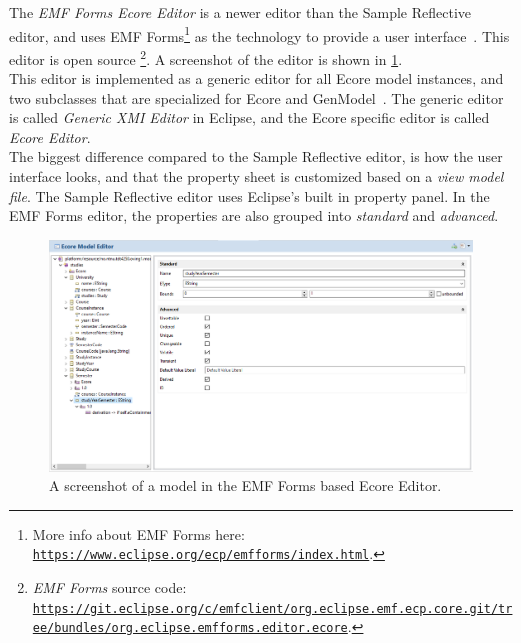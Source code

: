 The \textit{EMF Forms Ecore Editor} is a newer editor than the Sample Reflective editor, and uses EMF Forms\footnote{More info about EMF Forms here: \href{https://www.eclipse.org/ecp/emfforms/index.html}{\nolinkurl{https://www.eclipse.org/ecp/emfforms/index.html}}.} as the technology to provide a user interface~\cite{eclipsesourceEMFFormsEditors2016}.
This editor is \gls{open source}%
\footnote{\textit{EMF Forms} source code: \href{https://git.eclipse.org/c/emfclient/org.eclipse.emf.ecp.core.git/tree/bundles/org.eclipse.emfforms.editor.ecore}{\nolinkurl{https://git.eclipse.org/c/emfclient/org.eclipse.emf.ecp.core.git/tree/bundles/org.eclipse.emfforms.editor.ecore}}.}.
A screenshot of the editor is shown in \cref{fig:emf-forms-ecore-editor}.\\

This editor is implemented as a generic editor for all \gls{Ecore} model instances, and two subclasses that are specialized for \gls{Ecore} and GenModel~\cite{eclipsesourceEMFFormsEditors2016}.
The generic editor is called \textit{Generic XMI Editor} in \gls{Eclipse}, and the \gls{Ecore} specific editor is called \textit{Ecore Editor}.\\

The biggest difference compared to the Sample Reflective editor, is how the user interface looks, and that the property sheet is customized based on a \textit{view model file}.
The Sample Reflective editor uses \gls{Eclipse}'s built in property panel.
In the EMF Forms editor, the properties are also grouped into \textit{standard} and \textit{advanced}.

\begin{figure}[htbp]  %
  \centering
  \includegraphics[width=\textwidth]{figures/pre-project/ecore-eclipse-emf-forms-model-editor.png}
  \caption[EMF Forms Ecore Editor]{A screenshot of a model in the EMF Forms based Ecore Editor.}\label{fig:emf-forms-ecore-editor}
\end{figure}



